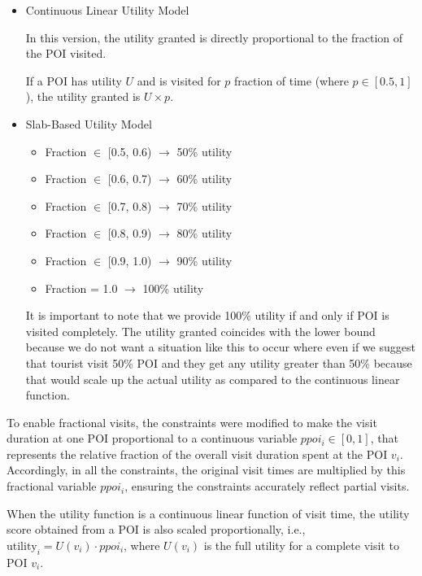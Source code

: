 \begin{itemize}
\item {Continuous Linear Utility Model}

In this version, the utility granted is directly proportional to the fraction of the POI visited.

If a POI has utility $U$ and is visited for $p$ fraction of time (where $p \in [0.5, 1]$), the utility granted is $U \times p$.

\item{Slab-Based Utility Model}
\begin{itemize}[noitemsep, topsep=0pt]
    \item Fraction $\in$ [0.5, 0.6) $\rightarrow$ 50\% utility
    \item Fraction $\in$ [0.6, 0.7) $\rightarrow$ 60\% utility
    \item Fraction $\in$ [0.7, 0.8) $\rightarrow$ 70\% utility
    \item Fraction $\in$ [0.8, 0.9) $\rightarrow$ 80\% utility
    \item Fraction $\in$ [0.9, 1.0) $\rightarrow$ 90\% utility
    \item Fraction = 1.0 $\rightarrow$ 100\% utility
\end{itemize}

It is important to note that we provide 100\% utility if and only if POI is visited completely. The utility granted coincides with the lower bound because we do not want a situation like this to occur where even if we suggest that tourist visit 50\% POI and they get any utility greater than 50\% because that would scale up the actual utility as compared to the continuous linear function.
\end{itemize}

To enable fractional visits, the constraints were modified to make the visit duration at one POI proportional to a continuous variable \( ppoi_i \in [0,1] \), that represents the relative fraction of the overall visit duration spent at the POI \( v_i \). Accordingly, in all the constraints, the original visit times are multiplied by this fractional variable \( ppoi_i \), ensuring the constraints accurately reflect partial visits.

When the utility function is a continuous linear function of visit time, the utility score obtained from a POI is also scaled proportionally, i.e., \( \text{utility}_i = U(v_i) \cdot ppoi_i \), where \( U(v_i) \) is the full utility for a complete visit to POI \( v_i \).

